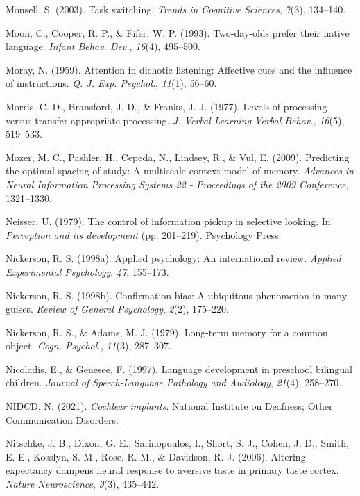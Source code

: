 \documentclass[
]{krantz}
\newlength{\cslhangindent}
\newenvironment{CSLReferences}[2] %
 {\begin{list}{}{%
  \setlength{\itemindent}{0pt}
  \setlength{\leftmargin}{0pt}
  \setlength{\parsep}{0pt}
  \ifodd #1
   \setlength{\leftmargin}{\cslhangindent}
   \setlength{\itemindent}{-1\cslhangindent}
  \fi
  \setlength{\itemsep}{#2\baselineskip}}}
 {\end{list}}
\begin{document}
\begin{CSLReferences}{1}{0}
Monsell, S. (2003). Task switching. \emph{Trends in Cognitive Sciences}, \emph{7}(3), 134--140.

Moon, C., Cooper, R. P., \& Fifer, W. P. (1993). Two-day-olds prefer their native language. \emph{Infant Behav. Dev.}, \emph{16}(4), 495--500.

Moray, N. (1959). Attention in dichotic listening: Affective cues and the influence of instructions. \emph{Q. J. Exp. Psychol.}, \emph{11}(1), 56--60.

Morris, C. D., Bransford, J. D., \& Franks, J. J. (1977). Levels of processing versus transfer appropriate processing. \emph{J. Verbal Learning Verbal Behav.}, \emph{16}(5), 519--533.

Mozer, M. C., Pashler, H., Cepeda, N., Lindsey, R., \& Vul, E. (2009). Predicting the optimal spacing of study: A multiscale context model of memory. \emph{Advances in Neural Information Processing Systems 22 - Proceedings of the 2009 Conference}, 1321--1330.

Neisser, U. (1979). The control of information pickup in selective looking. In \emph{Perception and its development} (pp. 201--219). Psychology Press.

Nickerson, R. S. (1998a). Applied psychology: An international review. \emph{Applied Experimental Psychology}, \emph{47}, 155--173.

Nickerson, R. S. (1998b). Confirmation bias: A ubiquitous phenomenon in many guises. \emph{Review of General Psychology}, \emph{2}(2), 175--220.

Nickerson, R. S., \& Adams, M. J. (1979). Long-term memory for a common object. \emph{Cogn. Psychol.}, \emph{11}(3), 287--307.

Nicoladis, E., \& Genesee, F. (1997). Language development in preschool bilingual children. \emph{Journal of Speech-Language Pathology and Audiology}, \emph{21}(4), 258--270.

NIDCD, N. (2021). \emph{Cochlear implants}. National Institute on Deafness; Other Communication Disorders.

Nitschke, J. B., Dixon, G. E., Sarinopoulos, I., Short, S. J., Cohen, J. D., Smith, E. E., Kosslyn, S. M., Rose, R. M., \& Davidson, R. J. (2006). Altering expectancy dampens neural response to aversive taste in primary taste cortex. \emph{Nature Neuroscience}, \emph{9}(3), 435--442.


\end{CSLReferences}
\end{document}
